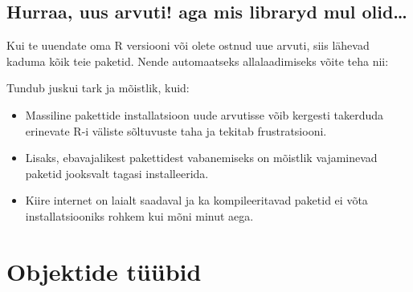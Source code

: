 \documentclass[]{book}
\newenvironment{Shaded}{\begin{snugshade}}{\end{snugshade}}
\newcommand{\KeywordTok}[1]{\textcolor[rgb]{0.13,0.29,0.53}{\textbf{#1}}}
\newcommand{\StringTok}[1]{\textcolor[rgb]{0.31,0.60,0.02}{#1}}
\newcommand{\OperatorTok}[1]{\textcolor[rgb]{0.81,0.36,0.00}{\textbf{#1}}}
\newcommand{\NormalTok}[1]{#1}
\providecommand{\tightlist}{%
  \setlength{\itemsep}{0pt}\setlength{\parskip}{0pt}}
\begin{document}
\section{Hurraa, uus arvuti! aga mis libraryd mul
olid\ldots{}}\label{hurraa-uus-arvuti-aga-mis-libraryd-mul-olid}

Kui te uuendate oma R versiooni või olete ostnud uue arvuti, siis
lähevad kaduma kõik teie paketid. Nende automaatseks allalaadimiseks
võite teha nii:

\begin{Shaded}
\end{Shaded}

Tundub juskui tark ja mõistlik, kuid:

\begin{itemize}
\tightlist
\item
  Massiline pakettide installatsioon uude arvutisse võib kergesti
  takerduda erinevate R-i väliste sõltuvuste taha ja tekitab
  frustratsiooni.
\item
  Lisaks, ebavajalikest pakettidest vabanemiseks on mõistlik vajaminevad
  paketid jooksvalt tagasi installeerida.
\item
  Kiire internet on laialt saadaval ja ka kompileeritavad paketid ei
  võta installatsiooniks rohkem kui mõni minut aega.
\end{itemize}

\chapter{Objektide tüübid}\label{obj}
\end{document}
